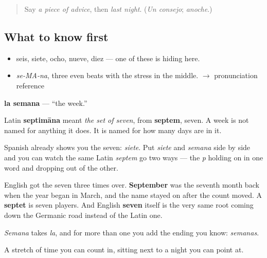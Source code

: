 \label{lesson:ES-C322-semana}



\begin{quote}
Say \emph{a piece of advice}, then \emph{last night}. (\emph{Un consejo}; \emph{anoche}.)
\end{quote}

\subsection*{What to know first}
\begin{itemize}
\raggedright
  \item seis, siete, ocho, nueve, diez — one of these is hiding here.
\end{itemize}

\begin{sounds}
\begin{itemize}
\raggedright
  \item \emph{se-MA-na}, three even beats with the stress in the middle. $\to$ pronunciation reference
\end{itemize}
\end{sounds}

\begin{cousinweb}
\textbf{la semana} — \textquotedblleft{}the week.\textquotedblright{}

Latin \textbf{septimāna} meant \emph{the set of seven}, from \textbf{septem}, seven. A week is not named for anything it does. It is named for how many days are in it.

Spanish already shows you the seven: \emph{siete}. Put \emph{siete} and \emph{semana} side by side and you can watch the same Latin \emph{septem} go two ways — the \emph{p} holding on in one word and dropping out of the other.

English got the seven three times over. \textbf{September} was the seventh month back when the year began in March, and the name stayed on after the count moved. A \textbf{septet} is seven players. And English \textbf{seven} itself is the very same root coming down the Germanic road instead of the Latin one.

\emph{Semana} takes \emph{la}, and for more than one you add the ending you know: \emph{semanas}.
\end{cousinweb}

\begin{grammarlens}[title={What you've built}]
A stretch of time you can count in, sitting next to a night you can point at.
\end{grammarlens}

